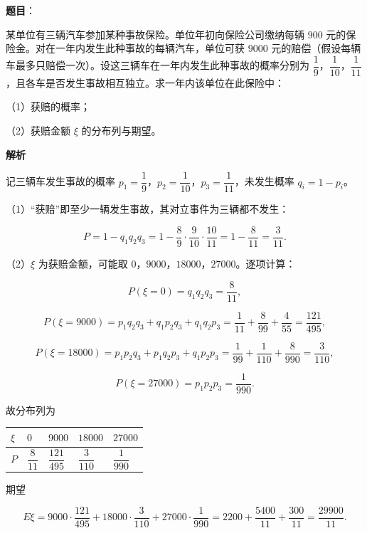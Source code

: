 \begin{answer}

\textbf{题目}：

某单位有三辆汽车参加某种事故保险。单位年初向保险公司缴纳每辆 $900$ 元的保险金。对在一年内发生此种事故的每辆汽车，单位可获 $9000$ 元的赔偿（假设每辆车最多只赔偿一次）。设这三辆车在一年内发生此种事故的概率分别为 $\dfrac19$，$\dfrac1{10}$，$\dfrac1{11}$，且各车是否发生事故相互独立。求一年内该单位在此保险中：

（1）获赔的概率；

（2）获赔金额 $\xi$ 的分布列与期望。

\textbf{解析}

记三辆车发生事故的概率 $p_1=\dfrac19$，$p_2=\dfrac1{10}$，$p_3=\dfrac1{11}$，未发生概率 $q_i=1-p_i$。

（1）“获赔”即至少一辆发生事故，其对立事件为三辆都不发生：

\nopagebreak[4]
\[P=1-q_1q_2q_3=1-\frac89\cdot\frac9{10}\cdot\frac{10}{11}=1-\frac8{11}=\frac3{11}.\]

（2）$\xi$ 为获赔金额，可能取 $0$，$9000$，$18000$，$27000$。逐项计算：

\nopagebreak[4]
\[P(\xi=0)=q_1q_2q_3=\frac8{11},\]

\nopagebreak[4]
\[P(\xi=9000)=p_1q_2q_3+q_1p_2q_3+q_1q_2p_3=\frac1{11}+\frac8{99}+\frac4{55}=\frac{121}{495},\]

\nopagebreak[4]
\[P(\xi=18000)=p_1p_2q_3+p_1q_2p_3+q_1p_2p_3=\frac1{99}+\frac1{110}+\frac8{990}=\frac3{110},\]

\nopagebreak[4]
\[P(\xi=27000)=p_1p_2p_3=\frac1{990}.\]

故分布列为

\begin{center}
\begin{tabular}{lllll}
\toprule
$\xi$ & $0$ & $9000$ & $18000$ & $27000$ \\
\midrule
$P$ & $\dfrac8{11}$ & $\dfrac{121}{495}$ & $\dfrac3{110}$ & $\dfrac1{990}$ \\
\bottomrule
\end{tabular}
\end{center}

期望

\nopagebreak[4]
\[E\xi=9000\cdot\frac{121}{495}+18000\cdot\frac3{110}+27000\cdot\frac1{990}
=2200+\frac{5400}{11}+\frac{300}{11}=\frac{29900}{11}.\]


\end{answer}
